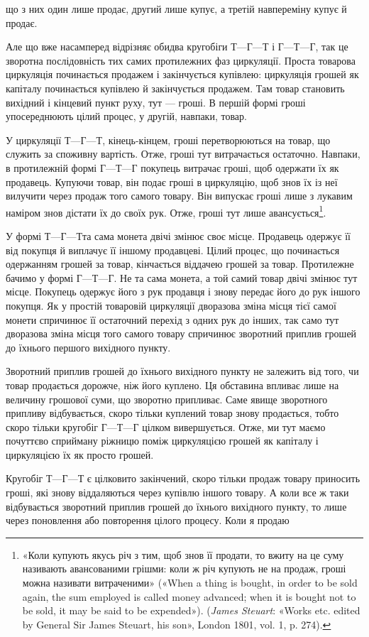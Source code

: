 \parcont{}  %
що з них один лише продає, другий лише купує, а третій навпереміну
купує й продає.

Але що вже насамперед відрізняє обидва кругобіги $Т — Г — Т$
і $Г — Т — Г$, так це зворотна послідовність тих самих протилежних
фаз циркуляції. Проста товарова циркуляція починається
продажем і закінчується купівлею: циркуляція грошей як капіталу
починається купівлею й закінчується продажем. Там
товар становить вихідний і кінцевий пункт руху, тут — гроші.
В першій формі гроші упосереднюють цілий процес, у другій,
навпаки, товар.

У циркуляції $Т — Г — Т$, кінець-кінцем, гроші перетворюються
на товар, що служить за споживну вартість. Отже, гроші
тут витрачається остаточно. Навпаки, в протилежній формі
$Г — Т — Г$ покупець витрачає гроші, щоб одержати їх як продавець.
Купуючи товар, він подає гроші в циркуляцію, щоб
знов їх із неї вилучити через продаж того самого товару. Він
випускає гроші лише з лукавим наміром знов дістати їх до своїх
рук. Отже, гроші тут лише авансується\footnote{
«Коли купують якусь річ з тим, щоб знов її продати, то вжиту
на це суму називають авансованими грішми: коли ж річ купують не
на продаж, гроші можна називати витраченими» («When a thing is bought,
in order to be sold again, the sum employed is called money advanced;
when it is bought not to be sold, it may be said to be expended»). (\emph{James
Steuart}: «Works etc. edited by General Sir James Steuart, his son», London
1801, vol. 1, p. 274).
}.

У формі $Т — Г — Т т$а сама монета двічі змінює своє місце.
Продавець одержує її від покупця й виплачує її іншому продавцеві.
Цілий процес, що починається одержанням грошей за товар,
кінчається віддачею грошей за товар. Протилежне бачимо у
формі $Г — Т — Г$. Не та сама монета, а той самий товар двічі
змінює тут місце. Покупець одержує його з рук продавця і знову
передає його до рук іншого покупця. Як у простій товаровій
циркуляції дворазова зміна місця тієї самої монети спричинює
її остаточний перехід з одних рук до інших, так само тут дворазова
зміна місця того самого товару спричинює зворотний приплив
грошей до їхнього першого вихідного пункту.

Зворотний приплив грошей до їхнього вихідного пункту не
залежить від того, чи товар продається дорожче, ніж його куплено.
Ця обставина впливає лише на величину грошової суми, що зворотно
припливає. Саме явище зворотного припливу відбувається,
скоро тільки куплений товар знову продається, тобто скоро
тільки кругобіг $Г — Т — Г$ цілком вивершується. Отже, ми тут
маємо почуттєво сприйману ріжницю поміж циркуляцією грошей
як капіталу і циркуляцією їх як просто грошей.

Кругобіг $Т — Г — Т$ є цілковито закінчений, скоро тільки
продаж товару приносить гроші, які знову віддаляються через
купівлю іншого товару. А коли все ж таки відбувається зворотний
приплив грошей до їхнього вихідного пункту, то лише через
поновлення або повторення цілого процесу. Коли я продаю
\parbreak{}  %
